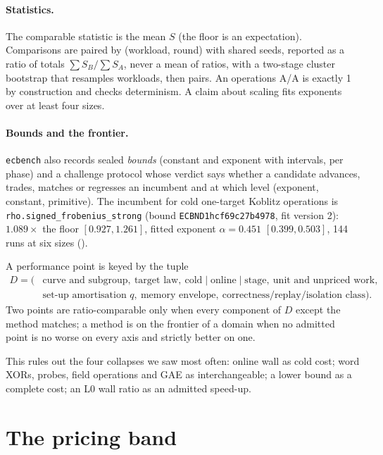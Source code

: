 \paragraph{Statistics.} The comparable statistic is the mean $S$ (the
floor is an expectation). Comparisons are paired by (workload, round) with
shared seeds, reported as a ratio of totals $\sum S_B/\sum S_A$, never a
mean of ratios, with a two-stage cluster bootstrap that resamples
workloads, then pairs. An operations A/A is exactly 1 by construction and
checks determinism. A claim about scaling fits exponents over at least
four sizes.

\paragraph{Bounds and the frontier.} \texttt{ecbench} also records sealed
\emph{bounds} (constant and exponent with intervals, per phase) and a
challenge protocol whose verdict says whether a candidate advances,
trades, matches or regresses an incumbent and at which level (exponent,
constant, primitive). The incumbent for cold one-target Koblitz operations
is \texttt{rho.signed\_frobenius\_strong} (bound
\texttt{ECBND1hcf69c27b4978}, fit version 2): $1.089\times$ the floor $[0.927,1.261]$,
fitted exponent $\alpha=0.451$ $[0.399,0.503]$, 144 runs at six sizes
().

\begin{definition}[comparability]\label{def:domain}
A performance point is keyed by the tuple
\begin{align*}
D=\bigl(&\text{curve and subgroup},\ \text{target law},\
  \text{cold}\mid\text{online}\mid\text{stage},\ \text{unit and unpriced work},\\
  &\text{set-up amortisation }q,\ \text{memory envelope},\
  \text{correctness/replay/isolation class}\bigr).
\end{align*}
Two points are ratio-comparable only when every component of $D$ except
the method matches; a method is on the frontier of a domain when no admitted point is
no worse on every axis and strictly better on one.
\end{definition}
\noindent This rules out the four collapses we saw most often: online wall
as cold cost; word XORs, probes, field operations and GAE as
interchangeable; a lower bound as a complete cost; an L0 wall ratio as an
admitted speed-up.

\section{The pricing band}\label{sec:band}

